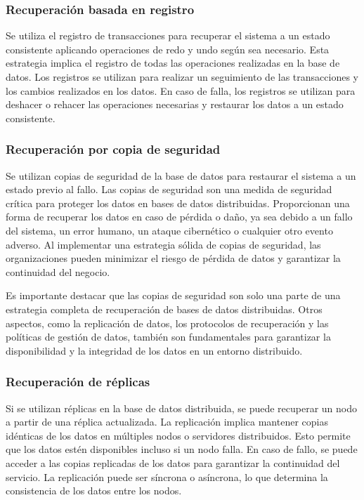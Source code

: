 \subsubsection{Recuperación basada en registro}
\noindent
Se utiliza el registro de transacciones para recuperar el sistema a un estado consistente aplicando operaciones de redo y undo según sea necesario. Esta estrategia implica el registro de todas las operaciones realizadas en la base de datos. Los registros se utilizan para realizar un seguimiento de las transacciones y los cambios realizados en los datos. En caso de falla, los registros se utilizan para deshacer o rehacer las operaciones necesarias y restaurar los datos a un estado consistente.

\subsubsection{Recuperación por copia de seguridad}
\noindent
Se utilizan copias de seguridad de la base de datos para restaurar el sistema a un estado previo al fallo. Las copias de seguridad son una medida de seguridad crítica para proteger los datos en bases de datos distribuidas. Proporcionan una forma de recuperar los datos en caso de pérdida o daño, ya sea debido a un fallo del sistema, un error humano, un ataque cibernético o cualquier otro evento adverso. Al implementar una estrategia sólida de copias de seguridad, las organizaciones pueden minimizar el riesgo de pérdida de datos y garantizar la continuidad del negocio.

Es importante destacar que las copias de seguridad son solo una parte de una estrategia completa de recuperación de bases de datos distribuidas. Otros aspectos, como la replicación de datos, los protocolos de recuperación y las políticas de gestión de datos, también son fundamentales para garantizar la disponibilidad y la integridad de los datos en un entorno distribuido.

\subsubsection{Recuperación de réplicas}
\noindent
Si se utilizan réplicas en la base de datos distribuida, se puede recuperar un nodo a partir de una réplica actualizada. La replicación implica mantener copias idénticas de los datos en múltiples nodos o servidores distribuidos. Esto permite que los datos estén disponibles incluso si un nodo falla. En caso de fallo, se puede acceder a las copias replicadas de los datos para garantizar la continuidad del servicio. La replicación puede ser síncrona o asíncrona, lo que determina la consistencia de los datos entre los nodos.

